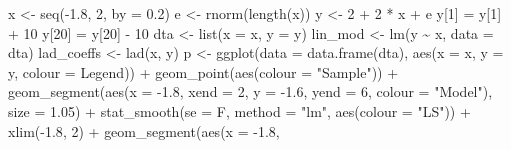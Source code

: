 \documentclass[
]{article}
\newenvironment{Shaded}{\begin{snugshade}}{\end{snugshade}}
\newcommand{\AttributeTok}[1]{\textcolor[rgb]{0.77,0.63,0.00}{#1}}
\newcommand{\DecValTok}[1]{\textcolor[rgb]{0.00,0.00,0.81}{#1}}
\newcommand{\FloatTok}[1]{\textcolor[rgb]{0.00,0.00,0.81}{#1}}
\newcommand{\FunctionTok}[1]{\textcolor[rgb]{0.00,0.00,0.00}{#1}}
\newcommand{\NormalTok}[1]{#1}
\newcommand{\OtherTok}[1]{\textcolor[rgb]{0.56,0.35,0.01}{#1}}
\newcommand{\SpecialCharTok}[1]{\textcolor[rgb]{0.00,0.00,0.00}{#1}}
\newcommand{\StringTok}[1]{\textcolor[rgb]{0.31,0.60,0.02}{#1}}
\begin{document}
\begin{Shaded}
\begin{Highlighting}[]
\NormalTok{x }\OtherTok{\textless{}{-}} \FunctionTok{seq}\NormalTok{(}\SpecialCharTok{{-}}\FloatTok{1.8}\NormalTok{, }\DecValTok{2}\NormalTok{, }\AttributeTok{by =} \FloatTok{0.2}\NormalTok{)}
\NormalTok{e }\OtherTok{\textless{}{-}} \FunctionTok{rnorm}\NormalTok{(}\FunctionTok{length}\NormalTok{(x))}
\NormalTok{y }\OtherTok{\textless{}{-}} \DecValTok{2} \SpecialCharTok{+} \DecValTok{2} \SpecialCharTok{*}\NormalTok{ x }\SpecialCharTok{+}\NormalTok{ e}
\NormalTok{y[}\DecValTok{1}\NormalTok{] }\OtherTok{=}\NormalTok{ y[}\DecValTok{1}\NormalTok{] }\SpecialCharTok{+} \DecValTok{10}
\NormalTok{y[}\DecValTok{20}\NormalTok{] }\OtherTok{=}\NormalTok{ y[}\DecValTok{20}\NormalTok{] }\SpecialCharTok{{-}} \DecValTok{10}
\NormalTok{dta }\OtherTok{\textless{}{-}} \FunctionTok{list}\NormalTok{(}\AttributeTok{x =}\NormalTok{ x, }\AttributeTok{y =}\NormalTok{ y)}
\NormalTok{lin\_mod }\OtherTok{\textless{}{-}} \FunctionTok{lm}\NormalTok{(y }\SpecialCharTok{\textasciitilde{}}\NormalTok{ x, }\AttributeTok{data =}\NormalTok{ dta)}
\NormalTok{lad\_coeffs }\OtherTok{\textless{}{-}} \FunctionTok{lad}\NormalTok{(x, y)}
\NormalTok{p }\OtherTok{\textless{}{-}} \FunctionTok{ggplot}\NormalTok{(}\AttributeTok{data =} \FunctionTok{data.frame}\NormalTok{(dta), }\FunctionTok{aes}\NormalTok{(}\AttributeTok{x =}\NormalTok{ x, }\AttributeTok{y =}\NormalTok{ y, }\AttributeTok{colour =}\NormalTok{ Legend)) }\SpecialCharTok{+} \FunctionTok{geom\_point}\NormalTok{(}\FunctionTok{aes}\NormalTok{(}\AttributeTok{colour =} \StringTok{"Sample"}\NormalTok{)) }\SpecialCharTok{+} 
    \FunctionTok{geom\_segment}\NormalTok{(}\FunctionTok{aes}\NormalTok{(}\AttributeTok{x =} \SpecialCharTok{{-}}\FloatTok{1.8}\NormalTok{, }\AttributeTok{xend =} \DecValTok{2}\NormalTok{, }\AttributeTok{y =} \SpecialCharTok{{-}}\FloatTok{1.6}\NormalTok{, }\AttributeTok{yend =} \DecValTok{6}\NormalTok{, }\AttributeTok{colour =} \StringTok{"Model"}\NormalTok{), }\AttributeTok{size =} \FloatTok{1.05}\NormalTok{) }\SpecialCharTok{+} 
    \FunctionTok{stat\_smooth}\NormalTok{(}\AttributeTok{se =}\NormalTok{ F, }\AttributeTok{method =} \StringTok{"lm"}\NormalTok{, }\FunctionTok{aes}\NormalTok{(}\AttributeTok{colour =} \StringTok{"LS"}\NormalTok{)) }\SpecialCharTok{+} \FunctionTok{xlim}\NormalTok{(}\SpecialCharTok{{-}}\FloatTok{1.8}\NormalTok{, }\DecValTok{2}\NormalTok{) }\SpecialCharTok{+} \FunctionTok{geom\_segment}\NormalTok{(}\FunctionTok{aes}\NormalTok{(}\AttributeTok{x =} \SpecialCharTok{{-}}\FloatTok{1.8}\NormalTok{, }

\end{Highlighting}
\end{Shaded}
\end{document}
